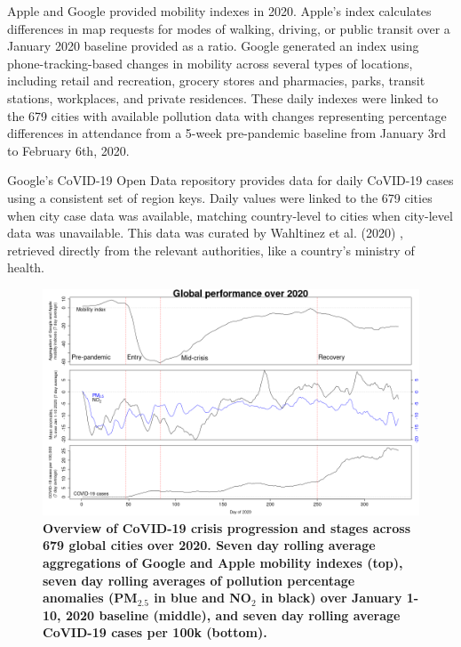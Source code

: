 \documentclass[preprint,12pt]{elsarticle}
\begin{document}
Apple\cite{Apple2020} and Google\cite{Google2020} provided mobility indexes in 2020. Apple's index calculates differences in map requests for modes of walking, driving, or public transit over a January 2020 baseline provided as a ratio. Google generated an index using phone-tracking-based changes in mobility across several types of locations, including retail and recreation, grocery stores and pharmacies, parks, transit stations, workplaces, and private residences. These daily indexes were linked to the 679 cities with available pollution data with changes representing percentage differences in attendance from a 5-week pre-pandemic baseline from January 3rd to February 6th, 2020\cite{owidcoronavirus}.

Google's CoVID-19 Open Data repository\cite{Google2022} provides data for daily CoVID-19 cases using a consistent set of region keys. Daily values were linked to the 679 cities when city case data was available, matching country-level to cities when city-level data was unavailable. This data was curated by Wahltinez et al. (2020) \citep{Wahltinez2020}, retrieved directly from the relevant authorities, like a country's ministry of health.









\begin{figure}
\centering
\includegraphics[trim={0 0 15 20},clip,scale=0.45]{Images/LancetPHOverall.png}
\caption{\bf Overview of CoVID-19 crisis progression and stages across 679 global cities over 2020. Seven day rolling average aggregations of Google and Apple mobility indexes (top), seven day rolling averages of pollution percentage anomalies (PM$_{2.5}$ in blue and NO$_{2}$ in black) over January 1-10, 2020 baseline (middle), and seven day rolling average CoVID-19 cases per 100k (bottom).}
 \label{fig:stages}
\end{figure}
\end{document}
